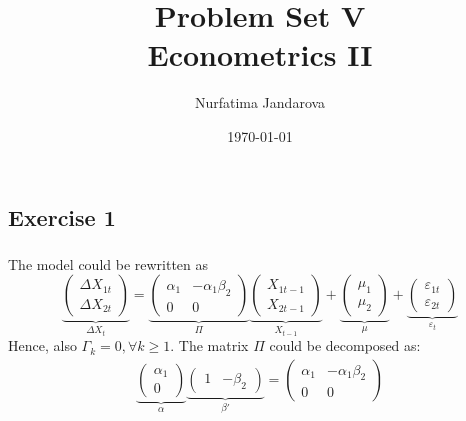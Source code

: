 \documentclass[]{article}
\title{Problem Set V \\ \large Econometrics II}
\author{Nurfatima Jandarova}
\date{\today}
\begin{document}
\maketitle

\subsection*{Exercise 1}

\subsubsection{}
\label{subsub: 1a}
The model could be rewritten as
\begin{equation}
	\underbrace{\begin{pmatrix}
		\Delta X_{1t} \\ \Delta X_{2t}
	\end{pmatrix}}_{\Delta X_t} = \underbrace{\begin{pmatrix}
		\alpha_1 & -\alpha_1\beta_2 \\ 0 & 0
	\end{pmatrix}}_{\Pi}\underbrace{\begin{pmatrix}
		X_{1t-1} \\ X_{2t-1}
	\end{pmatrix}}_{X_{t-1}} + \underbrace{\begin{pmatrix}
		\mu_1 \\ \mu_2
	\end{pmatrix}}_\mu + \underbrace{\begin{pmatrix}
		\varepsilon_{1t} \\ \varepsilon_{2t}
	\end{pmatrix}}_{\varepsilon_t}\nonumber
\end{equation}
Hence, also $\Gamma_k = 0, \forall k \geq 1$. The matrix $\Pi$ could be decomposed as:
\begin{equation}
	\begin{split}
		\underbrace{\begin{pmatrix}
			\alpha_1 \\ 0
		\end{pmatrix}}_\alpha\underbrace{\begin{pmatrix}
			1 & -\beta_2
		\end{pmatrix}}_{\beta'} = \begin{pmatrix}
		\alpha_1 & -\alpha_1\beta_2 \\ 0 & 0
		\end{pmatrix} \nonumber
	\end{split}
\end{equation}
\end{document}

